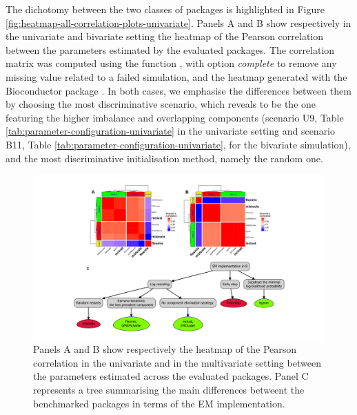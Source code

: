 The dichotomy between the two classes of packages is highlighted in Figure \ref{fig:heatmap-all-correlation-plots-univariate}.
Panels A and B show respectively in the univariate and bivariate setting the heatmap of the Pearson correlation between the parameters estimated by the evaluated packages. The correlation matrix was computed using the function
, with option \emph{complete} to remove any missing value related to a failed simulation, and the heatmap generated with the Bioconductor package . In both cases, we emphasise the differences between them by choosing the most discriminative scenario, which reveals to be the one featuring the higher imbalance and overlapping components (scenario U9, Table \ref{tab:parameter-configuration-univariate} in the univariate setting and scenario B11, Table \ref{tab:parameter-configuration-univariate}, for the bivariate simulation), and the most discriminative initialisation method, namely the random one.

\begin{figure}

{\centering \includegraphics[width=1\linewidth]{./figs/dichotomy_package_conclusion} 

}

\caption{Panels A and B show respectively the heatmap of the Pearson correlation in the univariate and in the multivariate setting between the parameters estimated across the evaluated packages. Panel C represents a tree summarising the main differences betweent the benchmarked packages in terms of the EM implementation.}\label{fig:dichotomy-package-conclusion}
\end{figure}

